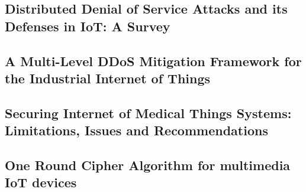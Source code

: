 \subsection{Distributed Denial of Service Attacks and its Defenses in IoT: A
Survey}



\subsection{A Multi-Level DDoS Mitigation Framework for the Industrial Internet
of Things}



\subsection{Securing Internet of Medical Things Systems: Limitations, Issues and
Recommendations}



\subsection{One Round Cipher Algorithm for multimedia IoT devices}
\label{sec:iotAlg}


